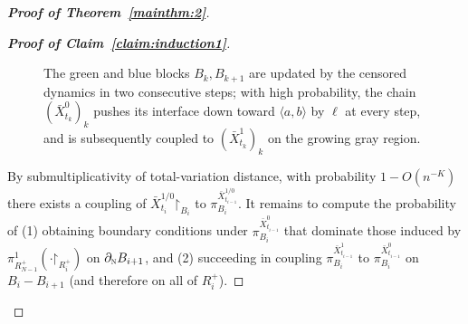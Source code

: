 \documentclass[reqno,11pt]{amsart}
\numberwithin{equation}{section}
\renewcommand{\restriction}{\mathord{\upharpoonright}}
\theoremstyle{definition}{
\newtheorem{example}[theorem]{Example}
\newtheorem{definition}[theorem]{Definition}
\newtheorem*{definition*}{Definition}
\newtheorem{problem}[theorem]{Problem}
\newtheorem{question}[theorem]{Question}
\newtheorem{remark}[theorem]{Remark}
}
\newcommand{\north}{{\textsc{n}}}
\begin{document}
\begin{proof}[\textbf{\emph{Proof of Theorem~\ref{mainthm:2}}}]
\begin{proof}[\textbf{\emph{Proof of Claim~\ref{claim:induction1}}}]
\begin{figure}
  \caption{The green and blue blocks $B_{k}, B_{k+1}$ are updated by the censored dynamics in two consecutive steps; with high probability, the chain $(\bar X_{t_k}^0)_{k}$ pushes its interface down toward $\langle a,b\rangle$ by $\ell$ at every step, and is subsequently coupled to $(\bar X_{t_k}^1)_k$ on the growing gray region.} 
  \label{fig:pushing-the-interface}
\end{figure}

By submultiplicativity of total-variation distance, with probability $1-O(n^{-K})$ there exists a coupling of $\bar X_{t_{i}}^{1/0}\restriction_{B_{i}}$ to $\pi_{B_{i}}^{\bar X_{t_{i-1}}^{1/0}}$. It remains to compute the probability of (1) obtaining boundary conditions under $\pi_{B_{i}}^{\bar X_{t_{i-1}}^{0}}$ that dominate those induced by $\pi_{R_{N-1}^+}^1(\cdot \restriction_{R_{i}^+})$ on $\partial_\north B_{i+1}$, and (2) succeeding in coupling $\pi_{B_{i}}^{\bar X_{t_{i-1}}^{1}}$ to $\pi_{B_{i}}^{\bar X_{t_{i-1}}^{0}}$ on $B_{i}-B_{i+1}$ (and therefore on all of $R_i^+$). 



\end{proof}
\end{proof}
\end{document}
